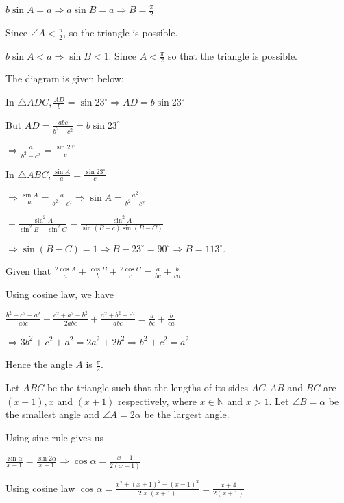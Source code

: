   $b\sin A = a \Rightarrow a\sin B = a \Rightarrow B = \frac{\pi}{2}$

  Since $\angle A < \frac{\pi}{2}$, so the triangle is possible.

  $b\sin A < a \Rightarrow \sin B < 1$. Since $A < \frac{\pi}{2}$ so that the triangle is possible.
\item The diagram is given below:

  \startplacefigure
    \externalfigure[17_18.pdf]
  \stopplacefigure

  In $\triangle ADC, \frac{AD}{b} = \sin23^\circ\Rightarrow AD = b\sin23^\circ$

  But $AD = \frac{abc}{b^2 - c^2} = b\sin23^\circ$

  $\Rightarrow \frac{a}{b^2 - c^2} = \frac{\sin23^\circ}{c}$

  In $\triangle ABC, \frac{\sin A}{a} = \frac{\sin23^\circ}{c}$

  $\Rightarrow \frac{\sin A}{a} = \frac{a}{b^2 - c^2}\Rightarrow \sin A = \frac{a^2}{b^2 - c^2}$

  $= \frac{\sin^2A}{\sin^2B - \sin^2C} = \frac{\sin^2A}{\sin(B + c)\sin(B - C)}$

  $\Rightarrow \sin (B - C) = 1 \Rightarrow B - 23^\circ = 90^\circ \Rightarrow B = 113^\circ$.
\item Given that $\frac{2\cos A}{a} + \frac{\cos B}{b} + \frac{2\cos C}{c} = \frac{a}{bc}
  + \frac{b}{ca}$

  Using cosine law, we have

  $\frac{b^2 + c^2 - a^2}{abc} + \frac{c^2 + a^2 - b^2}{2abc} + \frac{a^2 + b^2 - c^2}{abc} = \frac{a}{bc}
  + \frac{b}{ca}$

  $\Rightarrow 3b^2 + c^2 + a^2 = 2a^2 + 2b^2 \Rightarrow b^2 + c^2 = a^2$

  Hence the angle $A$ is $\frac{\pi}{2}$.
\item Let $ABC$ be the triangle such that the lengths of its sides $AC, AB$ and $BC$ are $(x - 1), x$ and
  $(x + 1)$ respectively, where $x\in\mathbb{N}$ and $x > 1$. Let $\angle B = \alpha$ be the smallest angle
  and $\angle A = 2\alpha$ be the largest angle.

  Using sine rule gives us

  $\frac{\sin\alpha}{x - 1} = \frac{\sin2\alpha}{x + 1}\Rightarrow \cos\alpha = \frac{x + 1}{2(x - 1)}$

  Using cosine law $\cos\alpha = \frac{x^2 + (x + 1)^2 - (x - 1)^2}{2.x.(x + 1)} = \frac{x + 4}{2(x + 1)}$

